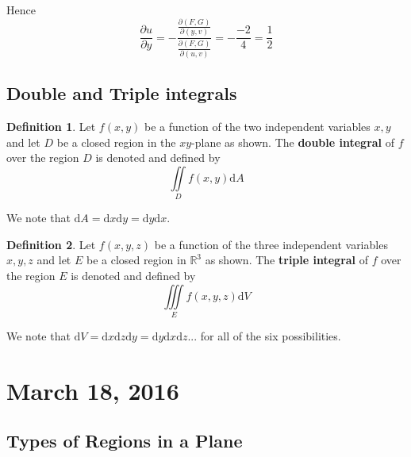 \documentclass[11pt]{article}
\theoremstyle{plain} %
\theoremstyle{definition}
\newtheorem*{definition}{Definition} %
\theoremstyle{example}
\theoremstyle{remark}
\begin{document}
Hence $$\frac{\partial u}{\partial y} = -\frac{\frac{\partial (F,G)}{\partial (y, v)}}{\frac{\partial (F,G)}{\partial (u, v)}} = -\frac{-2}{4} = \frac{1}{2}$$



\subsection{Double and Triple integrals}

\begin{definition}
Let $f(x,y)$ be a function of the two independent variables $x, y$ and let $D$ be a closed region in the $xy$-plane as shown. The \textbf{double integral} of $f$ over the region $D$ is denoted and defined by $$\iint\limits_Df(x,y)\mathrm d A$$

We note that $\mathrm d A = \mathrm d x \mathrm d y = \mathrm d y \mathrm d x$.
\end{definition}

\begin{definition}
Let $f(x, y, z)$ be a function of the three independent variables $x, y, z$ and let $E$ be a closed region in $\mathbb R^3$ as shown. The \textbf{triple integral} of $f$ over the region $E$ is denoted and defined by $$\iiint \limits_Ef(x, y, z) \mathrm d V$$

We note that $\mathrm d V = \mathrm d x \mathrm d z \mathrm d y = \mathrm d y \mathrm d x \mathrm d z ...$ for all of the six possibilities.
\end{definition}

\section{March 18, 2016}
\subsection{Types of Regions in a Plane}
\end{document}
